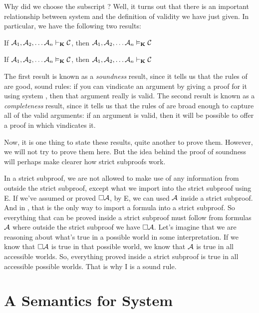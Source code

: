 Why did we choose the subscript \mlK? Well, it turns out that there is an important relationship between system \mlK{} and the definition of validity we have just given. In particular, we have the following two results:
\begin{compactlist}
	\item If $\mathcal{A}_1,\mathcal{A}_2, \dots \mathcal{A}_n\vdash_{\mathbf{K}}\mathcal{C}$, then $\mathcal{A}_1,\mathcal{A}_2, \dots \mathcal{A}_n\vDash_{\mathbf{K}}\mathcal{C}$
	\item If $\mathcal{A}_1,\mathcal{A}_2, \dots \mathcal{A}_n\vDash_{\mathbf{K}}\mathcal{C}$, then $\mathcal{A}_1,\mathcal{A}_2, \dots \mathcal{A}_n\vdash_{\mathbf{K}}\mathcal{C}$
\end{compactlist}
The first result is known as a \emph{soundness} result, since it tells us that the rules of \mlK{} are good, sound rules: if you can vindicate an argument by giving a proof for it using system \mlK, then that argument really is valid. The second result is known as a \emph{completeness} result, since it tells us that the rules of \mlK{} are broad enough to capture all of the valid arguments: if an argument is valid, then it will be possible to offer a proof in \mlK{} which vindicates it.

Now, it is one thing to state these results, quite another to prove them. However, we will not try to prove them here. But the idea behind the proof of soundness will perhaps make clearer how strict subproofs work.

In a strict subproof, we are not allowed to make use of any information from outside the strict subproof, except what we import into the strict subproof using \ebox E. If we've assumed or proved $\Box \mathcal{A}$, by \ebox E, we can used $\mathcal{A}$ inside a strict subproof. And in \mlK, that is the only way to import a formula into a strict subproof. So everything that can be proved inside a strict subproof must follow from formulas $\mathcal{A}$ where outside the strict subproof we have $\Box \mathcal{A}$. Let's imagine that we are reasoning about what's true in a possible world in some interpretation. If we know that $\Box\mathcal{A}$ is true in that possible world, we know that $\mathcal{A}$ is true in all accessible worlds. So, everything proved inside a strict subproof is true in all accessible possible worlds. That is why \ebox I is a sound rule.

\section{A Semantics for System \mlT}
\label{SemanticsT}

